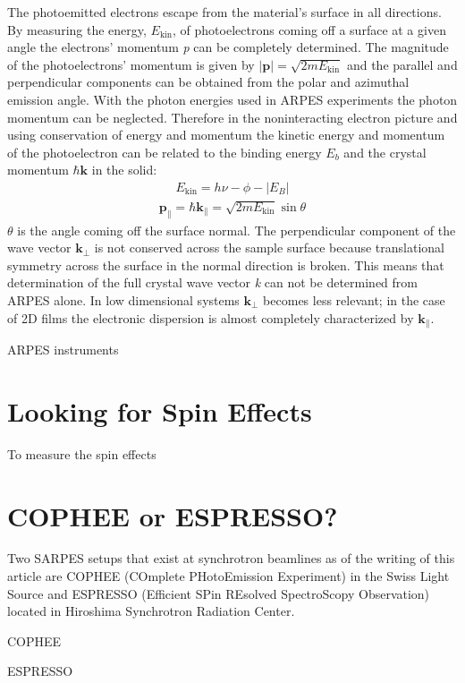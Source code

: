 \documentclass[12pt]{article}
\begin{document}
The photoemitted electrons escape from the material's surface in all directions.
By measuring the energy, $E_{\text{kin}}$, of photoelectrons coming off a surface at a given angle the electrons' momentum \emph{p} can be completely determined.
The magnitude of the photoelectrons' momentum is given by $|\boldsymbol{p}|=\sqrt{2mE_{\text{kin}}}$ and the parallel and perpendicular components can be obtained from the polar and azimuthal emission angle.
With the photon energies used in ARPES experiments the photon momentum can be neglected.
Therefore in the noninteracting electron picture and using conservation of energy and momentum the kinetic energy and momentum of the photoelectron can be related to the binding energy $E_b$ and the crystal momentum $\hbar\boldsymbol{k}$ in the solid\cite{Damascelli}:
\begin{align}
  E_{\text{kin}}=h\nu-\phi-|E_B|
\end{align}
\begin{align}
  \boldsymbol{p_{\parallel}}=\hbar\boldsymbol{k_{\parallel}}=\sqrt{2mE_{\text{kin}}}\sin\theta
\end{align}
$\theta$ is the angle coming off the surface normal.
The perpendicular component of the wave vector $\boldsymbol{k_{\perp}}$ is not conserved across the sample surface because translational symmetry across the surface in the normal direction is broken.  
This means that determination of the full crystal wave vector \emph{k} can not be determined from ARPES alone.
In low dimensional systems $\boldsymbol{k_{\perp}}$ becomes less relevant; in the case of 2D films the electronic dispersion is almost completely characterized by $\boldsymbol{k_{\parallel}}$.


ARPES instruments 


\section{Looking for Spin Effects}
To measure the spin effects 
\section{COPHEE or ESPRESSO?}
Two SARPES setups that exist at synchrotron beamlines as of the writing of this article are COPHEE (COmplete PHotoEmission Experiment) in the Swiss Light Source and ESPRESSO (Efficient SPin REsolved SpectroScopy Observation) located in Hiroshima Synchrotron Radiation Center.

COPHEE 

ESPRESSO
\end{document}
